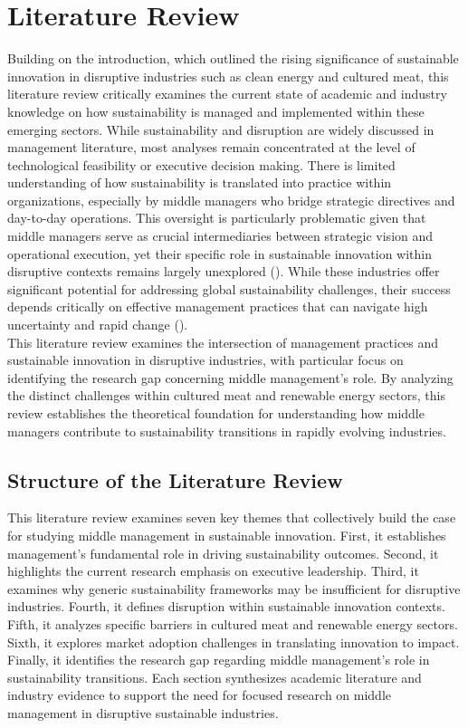	\section{Literature Review}
	\label{sec:litreview}
	
	Building on the introduction, which outlined the rising significance of sustainable innovation in disruptive industries such as clean energy and cultured meat, this literature review critically examines the current state of academic and industry knowledge on how sustainability is managed and implemented within these emerging sectors. While sustainability and disruption are widely discussed in management literature, most analyses remain concentrated at the level of technological feasibility or executive decision making. There is limited understanding of how sustainability is translated into practice within organizations, especially by middle managers who bridge strategic directives and day-to-day operations. This oversight is particularly problematic given that middle managers serve as crucial intermediaries between strategic vision and operational execution, yet their specific role in sustainable innovation within disruptive contexts remains largely unexplored (\textcite{Floyd1997}). While these industries offer significant potential for addressing global sustainability challenges, their success depends critically on effective management practices that can navigate high uncertainty and rapid change (\textcite{Christensen1997}). \\
	
	This literature review examines the intersection of management practices and sustainable innovation in disruptive industries, with particular focus on identifying the research gap concerning middle management’s role. By analyzing the distinct challenges within cultured meat and renewable energy sectors, this review establishes the theoretical foundation for understanding how middle managers contribute to sustainability transitions in rapidly evolving industries. \\
	
	\subsection*{Structure of the Literature Review}
	This literature review examines seven key themes that collectively build the case for studying middle management in sustainable innovation. First, it establishes management’s fundamental role in driving sustainability outcomes. Second, it highlights the current research emphasis on executive leadership. Third, it examines why generic sustainability frameworks may be insufficient for disruptive industries. Fourth, it defines disruption within sustainable innovation contexts. Fifth, it analyzes specific barriers in cultured meat and renewable energy sectors. Sixth, it explores market adoption challenges in translating innovation to impact. Finally, it identifies the research gap regarding middle management’s role in sustainability transitions. Each section synthesizes academic literature and industry evidence to support the need for focused research on middle management in disruptive sustainable industries. \\
	
